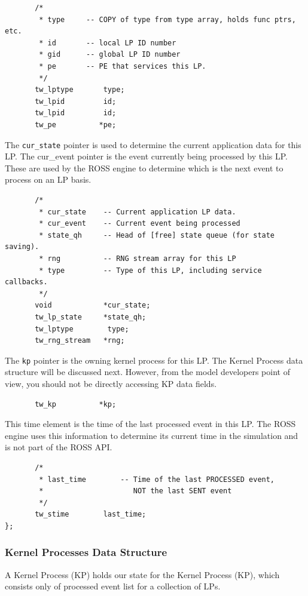\documentclass[12pt]{article}
\begin{document}
\begin{verbatim} 
       /*
        * type     -- COPY of type from type array, holds func ptrs, etc.
        * id       -- local LP ID number
        * gid      -- global LP ID number
        * pe       -- PE that services this LP.
        */
       tw_lptype       type;
       tw_lpid         id;
       tw_lpid         id;
       tw_pe          *pe;
\end{verbatim}
 
The {\tt cur\_state} pointer is used to determine the current application
data for this LP.  The cur\_event pointer is the event currently being
processed by this LP.  These are used by the ROSS engine to determine
which is the next event to process on an LP basis.

\begin{verbatim}
       /*
        * cur_state    -- Current application LP data.
        * cur_event    -- Current event being processed
        * state_qh     -- Head of [free] state queue (for state saving).
        * rng          -- RNG stream array for this LP
        * type         -- Type of this LP, including service callbacks.
        */
       void            *cur_state;
       tw_lp_state     *state_qh;
       tw_lptype        type;
       tw_rng_stream   *rng;
\end{verbatim}

The {\tt kp} pointer is the owning kernel process for this LP. The
Kernel Process data structure will be discussed next. However, from
the model developers point of view, you should not be directly
accessing KP data fields. 
 
\begin{verbatim}
       tw_kp          *kp;
\end{verbatim}

This time element is the time of the last processed event in this LP.
The ROSS engine uses this information to determine its current time
in the simulation and is not part of the ROSS API.

\begin{verbatim}
       /*
        * last_time        -- Time of the last PROCESSED event, 
        *                     NOT the last SENT event
        */
       tw_stime        last_time;
};
\end{verbatim}

\subsubsection{Kernel Processes Data Structure}
A Kernel Process (KP) holds our state for the Kernel Process (KP),
which consists only of processed event list for a collection of LPs.
\end{document}
